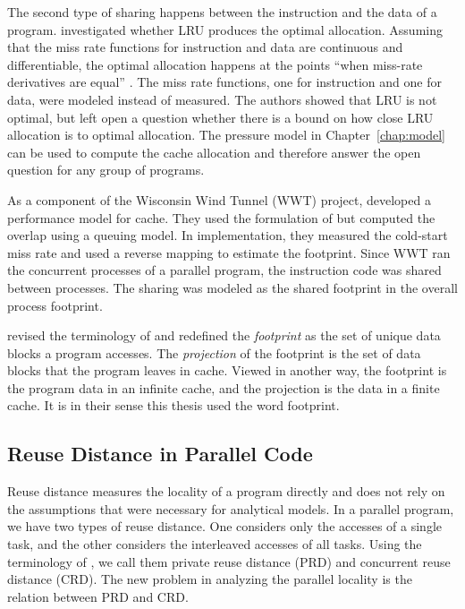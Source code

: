 The second type of sharing happens between the instruction and the
data of a program.  \citet{Stone+:TOC92} investigated whether LRU
produces the optimal allocation.  Assuming that the miss rate
functions for instruction and data are continuous and differentiable,
the optimal allocation happens at the points ``when miss-rate
derivatives are equal'' \citep{ThiebautS:TOC92}.  The miss rate
functions, one for instruction and one for data, were modeled instead
of measured.  The authors showed that LRU is not optimal, but left
open a question whether there is a bound on how close LRU allocation
is to optimal allocation.  The pressure model in
Chapter~\ref{chap:model} can be used to compute the cache allocation
and therefore answer the open question for any group of programs.

As a component of the Wisconsin Wind Tunnel (WWT) project,
\citet{FalsafiW:TOMACS97} developed a performance model for cache.
They used the formulation of \citet{ThiebautS:TOCS87} but computed the
overlap using a queuing model.  In implementation, they measured the
cold-start miss rate and used a reverse mapping to estimate the
footprint.  Since WWT ran the concurrent processes of a parallel
program, the instruction code was shared between processes.  The
sharing was modeled as the shared footprint in the overall process
footprint.

\citet{FalsafiW:TOMACS97} revised the terminology of \citet{ThiebautS:TOCS87}
and redefined the \emph{footprint} as the set of unique data blocks a
program accesses.  The \emph{projection} of the footprint is the set
of data blocks that the program leaves in cache.  Viewed in another
way, the footprint is the program data in an infinite cache, and the
projection is the data in a finite cache.  It is in their sense this
thesis used the word footprint.

\subsection{Reuse Distance in Parallel Code}

Reuse distance measures the locality of a program directly and does
not rely on the assumptions that were necessary for analytical models.
In a parallel program, we have two types of reuse distance.  One
considers only the accesses of a single task, and the other considers
the interleaved accesses of all tasks.  Using the terminology of
\citet{WuY:PACT11}, we call them private reuse distance (PRD) and
concurrent reuse distance (CRD).  The new problem in analyzing the parallel
locality is the relation between PRD and CRD.


